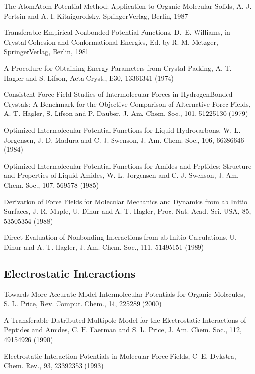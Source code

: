 \documentclass[letterpaper,11pt,english]{sphinxmanual}
\begin{document}
The Atom\sphinxhyphen{}Atom Potential Method: Application to Organic Molecular Solids, A. J. Pertsin and A. I. Kitaigorodsky, Springer\sphinxhyphen{}Verlag, Berlin, 1987

Transferable Empirical Nonbonded Potential Functions, D. E. Williams, in Crystal Cohesion and Conformational Energies, Ed. by R. M. Metzger, Springer\sphinxhyphen{}Verlag, Berlin, 1981

A Procedure for Obtaining Energy Parameters from Crystal Packing, A. T. Hagler and S. Lifson, Acta Cryst., B30, 1336\sphinxhyphen{}1341 (1974)

Consistent Force Field Studies of Intermolecular Forces in Hydrogen\sphinxhyphen{}Bonded Crystals:  A Benchmark for the Objective Comparison of Alternative Force Fields, A. T. Hagler, S. Lifson and P. Dauber, J. Am. Chem. Soc., 101, 5122\sphinxhyphen{}5130 (1979)

Optimized Intermolecular Potential Functions for Liquid Hydrocarbons, W. L. Jorgensen, J. D. Madura and C. J. Swenson, J. Am. Chem. Soc., 106, 6638\sphinxhyphen{}6646 (1984)

Optimized Intermolecular Potential Functions for Amides and Peptides: Structure and Properties of Liquid Amides, W. L. Jorgensen and C. J. Swenson, J. Am. Chem. Soc., 107, 569\sphinxhyphen{}578 (1985)

Derivation of Force Fields for Molecular Mechanics and Dynamics from ab Initio Surfaces, J. R. Maple, U. Dinur and A. T. Hagler, Proc. Nat. Acad. Sci. USA, 85, 5350\sphinxhyphen{}5354 (1988)

Direct Evaluation of Nonbonding Interactions from ab Initio Calculations, U. Dinur and A. T. Hagler, J. Am. Chem. Soc., 111, 5149\sphinxhyphen{}5151 (1989)


\subsection{Electrostatic Interactions}
\label{\detokenize{text/references:electrostatic-interactions}}
Towards More Accurate Model Intermolecular Potentials for Organic Molecules, S. L. Price, Rev. Comput. Chem., 14, 225\sphinxhyphen{}289 (2000)

A Transferable Distributed Multipole Model for the Electrostatic Interactions of Peptides and Amides, C. H. Faerman and S. L. Price, J. Am. Chem. Soc., 112, 4915\sphinxhyphen{}4926 (1990)

Electrostatic Interaction Potentials in Molecular Force Fields, C. E. Dykstra, Chem. Rev., 93, 2339\sphinxhyphen{}2353 (1993)
\end{document}
